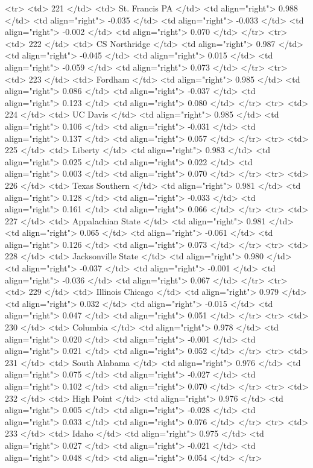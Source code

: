   <tr> <td> 221 </td> <td> St. Francis PA </td> <td align="right"> 0.988 </td> <td align="right"> -0.035 </td> <td align="right"> -0.033 </td> <td align="right"> -0.002 </td> <td align="right"> 0.070 </td> </tr>
  <tr> <td> 222 </td> <td> CS Northridge </td> <td align="right"> 0.987 </td> <td align="right"> -0.045 </td> <td align="right"> 0.015 </td> <td align="right"> -0.059 </td> <td align="right"> 0.073 </td> </tr>
  <tr> <td> 223 </td> <td> Fordham </td> <td align="right"> 0.985 </td> <td align="right"> 0.086 </td> <td align="right"> -0.037 </td> <td align="right"> 0.123 </td> <td align="right"> 0.080 </td> </tr>
  <tr> <td> 224 </td> <td> UC Davis </td> <td align="right"> 0.985 </td> <td align="right"> 0.106 </td> <td align="right"> -0.031 </td> <td align="right"> 0.137 </td> <td align="right"> 0.057 </td> </tr>
  <tr> <td> 225 </td> <td> Liberty </td> <td align="right"> 0.983 </td> <td align="right"> 0.025 </td> <td align="right"> 0.022 </td> <td align="right"> 0.003 </td> <td align="right"> 0.070 </td> </tr>
  <tr> <td> 226 </td> <td> Texas Southern </td> <td align="right"> 0.981 </td> <td align="right"> 0.128 </td> <td align="right"> -0.033 </td> <td align="right"> 0.161 </td> <td align="right"> 0.066 </td> </tr>
  <tr> <td> 227 </td> <td> Appalachian State </td> <td align="right"> 0.981 </td> <td align="right"> 0.065 </td> <td align="right"> -0.061 </td> <td align="right"> 0.126 </td> <td align="right"> 0.073 </td> </tr>
  <tr> <td> 228 </td> <td> Jacksonville State </td> <td align="right"> 0.980 </td> <td align="right"> -0.037 </td> <td align="right"> -0.001 </td> <td align="right"> -0.036 </td> <td align="right"> 0.067 </td> </tr>
  <tr> <td> 229 </td> <td> Illinois Chicago </td> <td align="right"> 0.979 </td> <td align="right"> 0.032 </td> <td align="right"> -0.015 </td> <td align="right"> 0.047 </td> <td align="right"> 0.051 </td> </tr>
  <tr> <td> 230 </td> <td> Columbia </td> <td align="right"> 0.978 </td> <td align="right"> 0.020 </td> <td align="right"> -0.001 </td> <td align="right"> 0.021 </td> <td align="right"> 0.052 </td> </tr>
  <tr> <td> 231 </td> <td> South Alabama </td> <td align="right"> 0.976 </td> <td align="right"> 0.075 </td> <td align="right"> -0.027 </td> <td align="right"> 0.102 </td> <td align="right"> 0.070 </td> </tr>
  <tr> <td> 232 </td> <td> High Point </td> <td align="right"> 0.976 </td> <td align="right"> 0.005 </td> <td align="right"> -0.028 </td> <td align="right"> 0.033 </td> <td align="right"> 0.076 </td> </tr>
  <tr> <td> 233 </td> <td> Idaho </td> <td align="right"> 0.975 </td> <td align="right"> 0.027 </td> <td align="right"> -0.021 </td> <td align="right"> 0.048 </td> <td align="right"> 0.054 </td> </tr>
